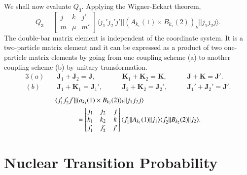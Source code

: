 We shall now evaluate $Q_3$. Applying the Wigner-Eckart theorem,
\begin{equation}
  Q_3 =
  \begin{bmatrix}    j & k & j'\\    m & \mu & m'  \end{bmatrix}
  \langle j_1' j_2' j' || (A_{k_1}(1) \times B_{k_2}(2))_k || j_1 j_2 j \rangle. \label{chap3-eq22}
\end{equation}
The double-bar matrix element is independent of the coordinate system. It is a two-particle matrix element and it can be expressed as a product of two one-particle matrix elements by going from one coupling scheme (a) to another coupling scheme (b) by unitary transformation.
\begin{alignat*}{3}
  (a) \quad&  {\boldsymbol  J}_1 + {\boldsymbol  J}_2 = {\boldsymbol  J}, \qquad &{\boldsymbol  K}_1+ {\boldsymbol  K}_2= {\boldsymbol  K}, \qquad &{\boldsymbol  J} + {\boldsymbol  K}= {\boldsymbol  J}'.\\
  (b) \quad &{\boldsymbol  J}_1 + {\boldsymbol  K}_1 = {\boldsymbol  J}_1', \qquad &{\boldsymbol  J}_2+{\boldsymbol  K}_2= {\boldsymbol  J}_2', \qquad & {\boldsymbol  J}_1'+{\boldsymbol  J}_2'={\boldsymbol  J}'.
\end{alignat*}
\begin{align}
  \langle j_1' j_2' j' || & (a_{k_1}(1) \times B_{k_2}(2))_k ||  j_1 j_2 j \rangle \notag \\
  & =  \begin{bmatrix} j_1 & j_2 & j\\ k_1 & k_2 & k \\ j_1' & j_2' & j'  \end{bmatrix}
  \langle j_1' || A_{k_1}(1)|| j_1 \rangle  \langle j_2' || B_{k_2} (2)|| j_2 \rangle . \label{chap3-eq23}
\end{align}

\section{Nuclear Transition Probability}\label{chap3-sec3}

